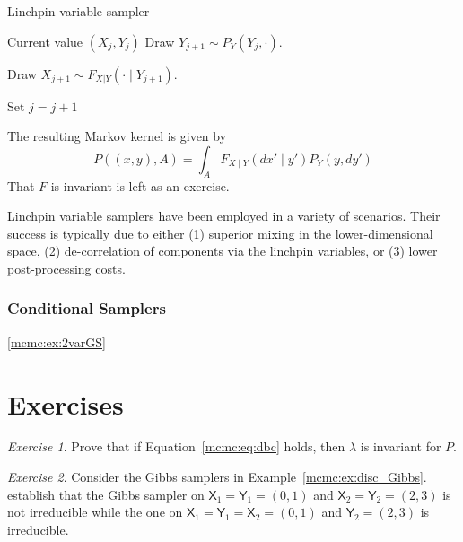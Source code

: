 \documentclass[12pt]{article}
\theoremstyle{plain}
\theoremstyle{definition}
\theoremstyle{remark}
\newtheorem{hw}{Exercise}[section]
\newcommand{\X}{\mathsf{X}}
\newcommand{\Y}{\mathsf{Y}}
\begin{document}
\begin{algorithm}
  \caption{Linchpin variable sampler} \label{alg:lvs}
  \begin{algorithmic}[1]
   Current value $(X_j, Y_j)$
  \State Draw $Y_{j+1} \sim P_{Y}(Y_{j}, \cdot) $. 

  \State Draw $X_{j+1} \sim F_{X|Y}(\cdot \mid Y_{j+1})$.

  \State Set $j=j+1$
\end{algorithmic}
\end{algorithm}

The resulting Markov kernel is given by
\begin{equation}
  \label{mcmc:eq:lv_kernel}
P((x,y), A) = \int_{A} F_{X \mid Y} (dx' \mid y') P_{Y}(y, dy')
\end{equation}
That $F$ is invariant is left as an exercise.

Linchpin variable samplers have been employed in a variety of
scenarios. Their success is typically due to either (1) superior
mixing in the lower-dimensional space, (2) de-correlation of
components via the linchpin variables, or (3) lower post-processing
costs.


\subsubsection{Conditional Samplers}
\label{mcmc:sec:conditional}

\ref{mcmc:ex:2varGS}


\section*{Exercises}
\begin{hw}
  \label{mcmc:hw:dbc}
Prove that if Equation~\ref{mcmc:eq:dbc} holds, then $\lambda$ is
invariant for $P$.
\end{hw}


\begin{hw}
  Consider the Gibbs samplers in Example~\ref{mcmc:ex:disc_Gibbs}.
  establish that the Gibbs sampler on $\X_1 = \Y_1 = (0,1)$ and
  $\X_2 = \Y_2 = (2,3)$ is not irreducible while the one on
  $\X_1 = \Y_1 = \X_2 = (0,1)$ and $ \Y_2 = (2,3)$ is irreducible.
\end{hw}
\end{document}

